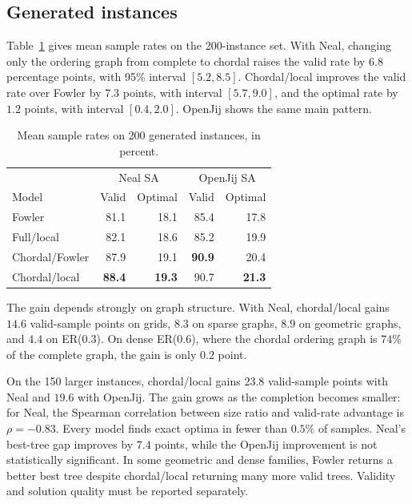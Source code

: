 \documentclass[10pt,a4paper]{article}
\begin{document}
\subsection{Generated instances}

Table~\ref{tab:general-rates} gives mean sample rates on the 200-instance set.
With Neal, changing only the ordering graph from complete to chordal raises
the valid rate by $6.8$ percentage points, with 95\% interval $[5.2,8.5]$.
Chordal/local improves the valid rate over Fowler by $7.3$ points, with
interval $[5.7,9.0]$, and the optimal rate by $1.2$ points, with interval
$[0.4,2.0]$. OpenJij shows the same main pattern.

\begin{table}[ht]
\centering
\caption{Mean sample rates on 200 generated instances, in percent.}
\label{tab:general-rates}
\begin{tabular}{lrrrr}
\toprule
& \multicolumn{2}{c}{Neal SA} & \multicolumn{2}{c}{OpenJij SA} \\
Model & Valid & Optimal & Valid & Optimal \\
\midrule
Fowler & 81.1 & 18.1 & 85.4 & 17.8 \\
Full/local & 82.1 & 18.6 & 85.2 & 19.9 \\
Chordal/Fowler & 87.9 & 19.1 & \textbf{90.9} & 20.4 \\
Chordal/local & \textbf{88.4} & \textbf{19.3} & 90.7 & \textbf{21.3} \\
\bottomrule
\end{tabular}
\end{table}

The gain depends strongly on graph structure. With Neal, chordal/local gains
$14.6$ valid-sample points on grids, $8.3$ on sparse graphs, $8.9$ on geometric
graphs, and $4.4$ on ER($0.3$). On dense ER($0.6$), where the chordal ordering
graph is $74\%$ of the complete graph, the gain is only $0.2$ point.

On the 150 larger instances, chordal/local gains $23.8$ valid-sample points
with Neal and $19.6$ with OpenJij. The gain grows as the completion becomes
smaller: for Neal, the Spearman correlation between size ratio and valid-rate
advantage is $\rho=-0.83$. Every model finds exact optima in fewer than $0.5\%$
of samples. Neal's best-tree gap improves by $7.4$ points, while the OpenJij
improvement is not statistically significant. In some geometric and dense
families, Fowler returns a better best tree despite chordal/local returning
many more valid trees. Validity and solution quality must be reported
separately.
\end{document}
